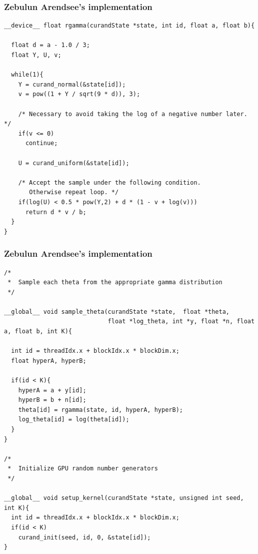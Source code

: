 \documentclass[handout]{beamer}
\numberwithin{equation}{section}
\begin{document}
\begin{frame}[fragile]
\frametitle{Zebulun Arendsee's implementation}
\begin{lstlisting}[name=mc]
__device__ float rgamma(curandState *state, int id, float a, float b){

  float d = a - 1.0 / 3;
  float Y, U, v;

  while(1){   
    Y = curand_normal(&state[id]);
    v = pow((1 + Y / sqrt(9 * d)), 3);

    /* Necessary to avoid taking the log of a negative number later. */
    if(v <= 0) 
      continue;
        
    U = curand_uniform(&state[id]);

    /* Accept the sample under the following condition. 
       Otherwise repeat loop. */
    if(log(U) < 0.5 * pow(Y,2) + d * (1 - v + log(v)))
      return d * v / b;
  }
}
\end{lstlisting}
\end{frame}



\begin{frame}[fragile]
\frametitle{Zebulun Arendsee's implementation}
\begin{lstlisting}[name=mc]
/*
 *  Sample each theta from the appropriate gamma distribution
 */
 
__global__ void sample_theta(curandState *state,  float *theta, 
                             float *log_theta, int *y, float *n, float a, float b, int K){
                             
  int id = threadIdx.x + blockIdx.x * blockDim.x;
  float hyperA, hyperB;
    
  if(id < K){
    hyperA = a + y[id];
    hyperB = b + n[id];
    theta[id] = rgamma(state, id, hyperA, hyperB);
    log_theta[id] = log(theta[id]);
  }
}

/* 
 *  Initialize GPU random number generators 
 */
 
__global__ void setup_kernel(curandState *state, unsigned int seed, int K){
  int id = threadIdx.x + blockIdx.x * blockDim.x;
  if(id < K)
    curand_init(seed, id, 0, &state[id]);
}
\end{lstlisting}
\end{frame}

\lstset{language = bash, basicstyle = \tiny}
\end{document}
